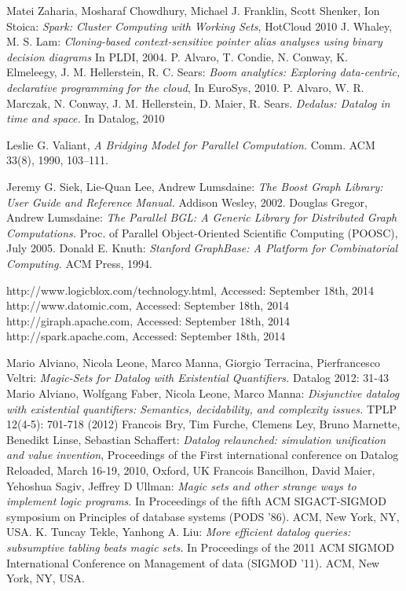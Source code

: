 \documentclass{pracamgr}
\theoremstyle{plain}
\theoremstyle{definition}
\theoremstyle{remark}
\begin{document}
\begin{thebibliography}{99}
 Matei Zaharia, Mosharaf Chowdhury, Michael J. Franklin, Scott Shenker, Ion Stoica: \textit{Spark: Cluster Computing with Working Sets}, HotCloud 2010
 J. Whaley, M. S. Lam: \textit{Cloning-based context-sensitive pointer alias analyses using binary decision diagrams} In PLDI, 2004.
 P. Alvaro, T. Condie, N. Conway, K. Elmeleegy, J. M. Hellerstein, R. C. Sears: \textit{Boom analytics: Exploring data-centric, declarative programming for the cloud}, In EuroSys, 2010.
 P. Alvaro, W. R. Marczak, N. Conway, J. M. Hellerstein, D. Maier, R. Sears. \textit{Dedalus: Datalog in time and space.} In Datalog, 2010

 Leslie G. Valiant, \emph{A Bridging Model for Parallel Computation.} Comm. ACM 33(8), 1990, 103–111.

 Jeremy G. Siek, Lie-Quan Lee, Andrew Lumsdaine: \textit{The Boost Graph Library: User Guide and Reference Manual.} Addison Wesley, 2002.
 Douglas Gregor, Andrew Lumsdaine: \textit{The Parallel BGL: A Generic Library for Distributed Graph Computations.} Proc. of Parallel Object-Oriented Scientific Computing (POOSC), July 2005.
 Donald E. Knuth: \textit{Stanford GraphBase: A Platform for Combinatorial Computing.} ACM Press, 1994.

 http://www.logicblox.com/technology.html, Accessed: September 18th, 2014
 http://www.datomic.com, Accessed: September 18th, 2014
 http://giraph.apache.com, Accessed: September 18th, 2014
 http://spark.apache.com, Accessed: September 18th, 2014


 Mario Alviano, Nicola Leone, Marco Manna, Giorgio Terracina, Pierfrancesco Veltri: \textit{Magic-Sets for Datalog with Existential Quantifiers.} Datalog 2012: 31-43
 Mario Alviano, Wolfgang Faber, Nicola Leone, Marco Manna: \textit{Disjunctive datalog with existential quantifiers: Semantics, decidability, and complexity issues.} TPLP 12(4-5): 701-718 (2012)
 Francois Bry, Tim Furche, Clemens Ley, Bruno Marnette, Benedikt Linse, Sebastian Schaffert: \textit{Datalog relaunched: simulation unification and value invention}, Proceedings of the First international conference on Datalog Reloaded, March 16-19, 2010, Oxford, UK
 Francois Bancilhon, David Maier, Yehoshua Sagiv, Jeffrey D Ullman: \textit{Magic sets and other strange ways to implement logic programs}. In Proceedings of the fifth ACM SIGACT-SIGMOD symposium on Principles of database systems (PODS '86). ACM, New York, NY, USA.
 K. Tuncay Tekle, Yanhong A. Liu: \textit{More efficient datalog queries: subsumptive tabling beats magic sets.} In Proceedings of the 2011 ACM SIGMOD International Conference on Management of data (SIGMOD '11). ACM, New York, NY, USA.

\end{thebibliography}
\end{document}
